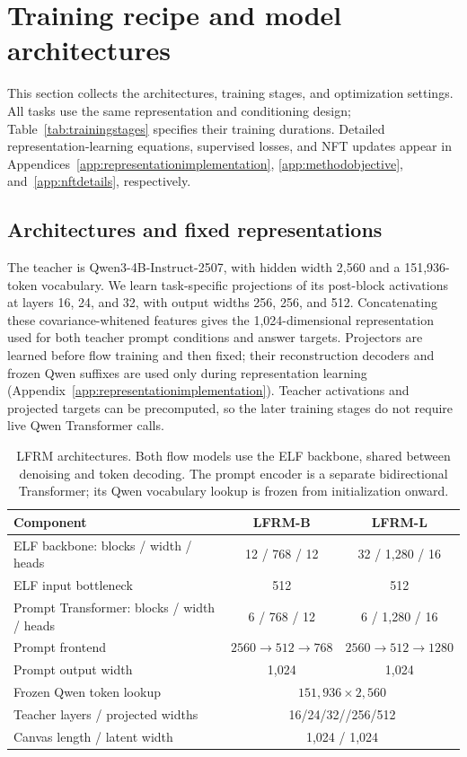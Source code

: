 \documentclass{article}
\begin{document}
\clearpage
\appendix
\section{Training recipe and model architectures}
\label{app:training}

This section collects the architectures, training stages, and optimization settings. All tasks use the same representation and conditioning design; Table~\ref{tab:trainingstages} specifies their training durations. Detailed representation-learning equations, supervised losses, and NFT updates appear in Appendices~\ref{app:representationimplementation}, \ref{app:methodobjective}, and~\ref{app:nftdetails}, respectively.

\subsection{Architectures and fixed representations}
\label{app:architecture}

The teacher is Qwen3-4B-Instruct-2507, with hidden width 2,560 and a 151,936-token vocabulary. We learn task-specific projections of its post-block activations at layers 16, 24, and 32, with output widths 256, 256, and 512. Concatenating these covariance-whitened features gives the 1,024-dimensional representation used for both teacher prompt conditions and answer targets. Projectors are learned before flow training and then fixed; their reconstruction decoders and frozen Qwen suffixes are used only during representation learning (Appendix~\ref{app:representationimplementation}). Teacher activations and projected targets can be precomputed, so the later training stages do not require live Qwen Transformer calls.

\begin{table}[!htb]
\centering\small
\setlength{\tabcolsep}{7pt}
\caption{LFRM architectures. Both flow models use the ELF backbone, shared between denoising and token decoding. The prompt encoder is a separate bidirectional Transformer; its Qwen vocabulary lookup is frozen from initialization onward.}
\label{tab:architectures}
\begin{tabular}{@{}lcc@{}}
\toprule
Component & LFRM-B & LFRM-L\\
\midrule
ELF backbone: blocks / width / heads & 12 / 768 / 12 & 32 / 1,280 / 16\\
ELF input bottleneck & 512 & 512\\
Prompt Transformer: blocks / width / heads & 6 / 768 / 12 & 6 / 1,280 / 16\\
Prompt frontend & $2560\to512\to768$ & $2560\to512\to1280$\\
Prompt output width & 1,024 & 1,024\\
Frozen Qwen token lookup & \multicolumn{2}{c}{$151{,}936\times2{,}560$}\\
Teacher layers / projected widths & \multicolumn{2}{c}{16/24/32\quad /\quad 256/256/512}\\
Canvas length / latent width & \multicolumn{2}{c}{1,024 / 1,024}\\
\bottomrule
\end{tabular}
\end{table}
\end{document}
